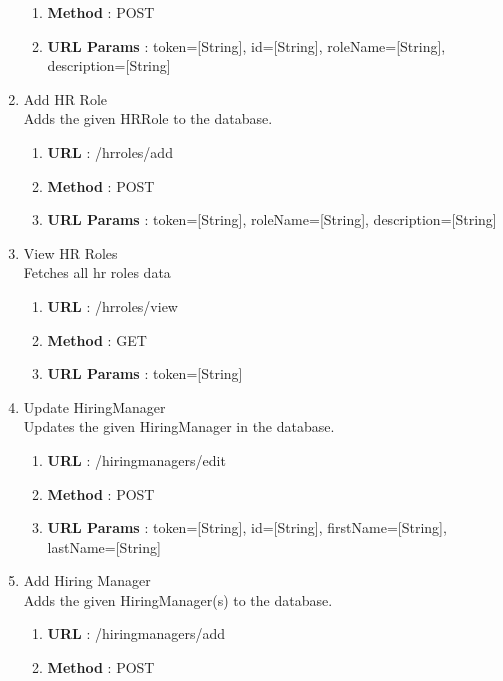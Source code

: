 \documentclass[11pt, titlepage]{article}
\begin{document}
\begin{enumerate}
\begin{enumerate}
                    \item \textbf{Method} : POST
                    \item \textbf{URL Params} : token=[String], id=[String], roleName=[String], description=[String]
                \end{enumerate}
        \item Add HR Role \\ 
             Adds the given HRRole to the database.
                \begin{enumerate}
                    \item \textbf{URL} : /hrroles/add
                    \item \textbf{Method} : POST
                    \item \textbf{URL Params} : token=[String], roleName=[String], description=[String]
                \end{enumerate}
        \item View HR Roles \\
             Fetches all hr roles data
                \begin{enumerate}
                    \item \textbf{URL} : /hrroles/view
                    \item \textbf{Method} : GET
                    \item \textbf{URL Params} : token=[String]
                \end{enumerate}
        \item Update HiringManager \\
             Updates the given HiringManager in the database.
                \begin{enumerate}
                    \item \textbf{URL} : /hiringmanagers/edit
                    \item \textbf{Method} : POST
                    \item \textbf{URL Params} : token=[String], id=[String], firstName=[String], lastName=[String]
                \end{enumerate}
        \item Add Hiring Manager \\ 
             Adds the given HiringManager(s) to the database.
                \begin{enumerate}
                    \item \textbf{URL} : /hiringmanagers/add
                    \item \textbf{Method} : POST

\end{enumerate}
\end{enumerate}
\end{document}
